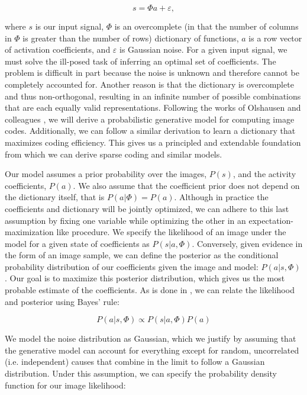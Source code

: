 \begin{equation} \label{eq:ch2_generative_model}
    s = \Phi a + \varepsilon,
\end{equation}

\noindent where $s$ is our input signal, $\Phi$ is an overcomplete (in that the number of columns in $\Phi$ is greater than the number of rows) dictionary of functions, $a$ is a row vector of activation coefficients, and $\varepsilon$ is Gaussian noise. For a given input signal, we must solve the ill-posed task of inferring an optimal set of coefficients. The problem is difficult in part because the noise is unknown and therefore cannot be completely accounted for. Another reason is that the dictionary is overcomplete and thus non-orthogonal, resulting in an infinite number of possible combinations that are each equally valid representations. Following the works of Olshausen and colleagues \parencite{olshausen1996learning, olshausen2003principles, karklin1999porbabilistic}, we will derive a probabilistic generative model for computing image codes. Additionally, we can follow a similar derivation to learn a dictionary that maximizes coding efficiency. This gives us a principled and extendable foundation from which we can derive sparse coding and similar models.

Our model assumes a prior probability over the images, $P(s)$, and the activity coefficients, $P(a)$. We also assume that the coefficient prior does not depend on the dictionary itself, that is $P(a|\Phi) = P(a)$. Although in practice the coefficients and dictionary will be jointly optimized, we can adhere to this last assumption by fixing one variable while optimizing the other in an expectation-maximization like procedure. We specify the likelihood of an image under the model for a given state of coefficients as $P(s|a,\Phi)$. Conversely, given evidence in the form of an image sample, we can define the posterior as the conditional probability distribution of our coefficients given the image and model: $P(a|s,\Phi)$. Our goal is to maximize this posterior distribution, which gives us the most probable estimate of the coefficients. As is done in \parencite{karklin1999porbabilistic}, we can relate the likelihood and posterior using Bayes' rule:

\begin{equation}\label{eq:ch2_bayes}
    P(a|s,\Phi) \propto P(s|a,\Phi) P(a)
\end{equation}

We model the noise distribution as Gaussian, which we justify by assuming that the generative model can account for everything except for random, uncorrelated (i.e. independent) causes that combine in the limit to follow a Gaussian distribution. Under this assumption, we can specify the probability density function for our image likelihood:

